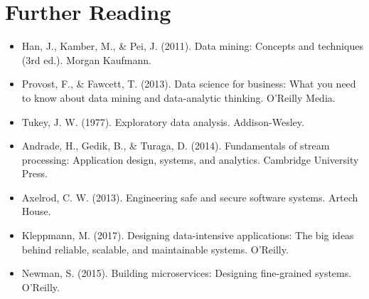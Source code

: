 
\section{Further Reading}
\begin{itemize}
    \item Han, J., Kamber, M., \& Pei, J. (2011). Data mining: Concepts and techniques (3rd ed.). Morgan Kaufmann.
    \item Provost, F., \& Fawcett, T. (2013). Data science for business: What you need to know about data mining and data-analytic thinking. O'Reilly Media.
    \item Tukey, J. W. (1977). Exploratory data analysis. Addison-Wesley.
    \item Andrade, H., Gedik, B., \& Turaga, D. (2014). Fundamentals of stream processing: Application
          design, systems, and analytics. Cambridge University Press.
    \item Axelrod, C. W. (2013). Engineering safe and secure software systems. Artech House.
    \item Kleppmann, M. (2017). Designing data-intensive applications: The big ideas behind reliable,
          scalable, and maintainable systems. O'Reilly.
    \item Newman, S. (2015). Building microservices: Designing fine-grained systems. O'Reilly.
\end{itemize}
